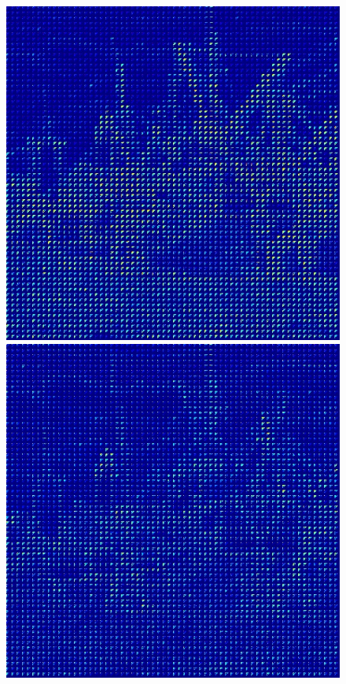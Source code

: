 \documentclass[12pt]{report}
\begin{document}
\begin{figure}[H]
\begin{center}
\includegraphics[scale=0.25]{../ImageRes/blockdct_masked_0.jpg} 
\includegraphics[scale=0.25]{../ImageRes/blockdct_masked_1.jpg} 

\end{center}
\end{figure}
\end{document}
